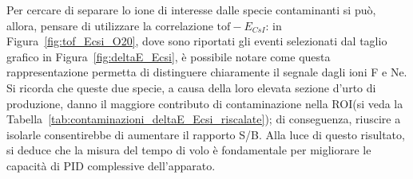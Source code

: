 Per cercare di separare lo ione di interesse dalle specie contaminanti si può, allora, pensare di utilizzare la correlazione $\mbox{tof} - E_{CsI}$: in Figura~\ref{fig:tof_Ecsi_O20}, dove sono riportati gli eventi selezionati dal taglio grafico in Figura~\ref{fig:deltaE_Ecsi}, è possibile notare come questa rappresentazione permetta di distinguere chiaramente il segnale dagli ioni F e Ne.
Si ricorda che queste due specie, a causa della loro elevata sezione d'urto di produzione, danno il maggiore contributo di contaminazione nella ROI(si veda la Tabella~\ref{tab:contaminazioni_deltaE_Ecsi_riscalate}); di conseguenza, riuscire a isolarle consentirebbe di aumentare il rapporto S/B.
Alla luce di questo risultato, si deduce che la misura del tempo di volo è fondamentale per migliorare le capacità di PID complessive dell'apparato.






\subsection{}

